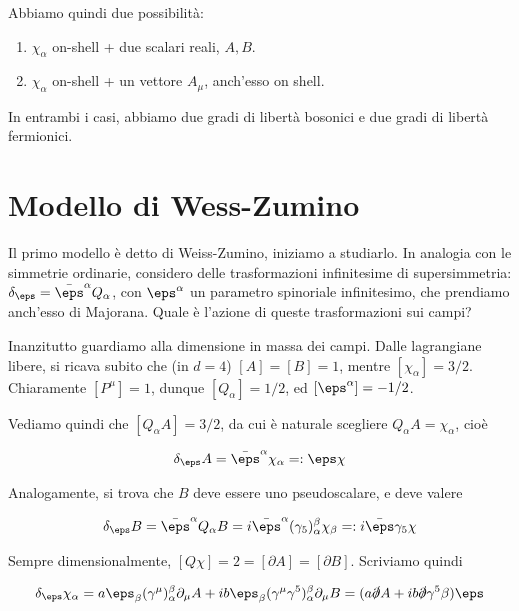 \documentclass{report}
\begin{document}
Abbiamo quindi due possibilità: 

\begin{enumerate}
    \item \(\chi_\alpha\) on-shell + due scalari reali, \(A, B\). 
    \item \(\chi_\alpha\) on-shell + un vettore \(A_\mu\), anch'esso on shell. 
\end{enumerate}

In entrambi i casi, abbiamo due gradi di libertà bosonici e due gradi di libertà fermionici. 

\section{Modello di Wess-Zumino}

Il primo modello è detto di Weiss-Zumino, iniziamo a studiarlo. In analogia con le simmetrie ordinarie, considero delle trasformazioni infinitesime di supersimmetria: \(\delta_\eps = \bar{\eps}^\alpha Q_\alpha\), con \(\eps^\alpha\) un parametro spinoriale infinitesimo, che prendiamo anch'esso di Majorana. Quale è l'azione di queste trasformazioni sui campi? 

Inanzitutto guardiamo alla dimensione in massa dei campi. Dalle lagrangiane libere, si ricava subito che (in \(d=4\)) \([A] = [B] = 1\), mentre \([\chi_\alpha] = 3/2\). Chiaramente \([P^\mu] = 1\), dunque \([Q_\alpha] = 1/2\), ed \([\eps^\alpha] = -1/2\). 

Vediamo quindi che \([Q_\alpha A] = 3/2\), da cui è naturale scegliere \(Q_\alpha A = \chi_\alpha\), cioè 

\begin{align}
    \delta_\eps A = \bar{\eps}^\alpha \chi_\alpha =: \eps \chi 
\end{align}

Analogamente, si trova che \(B\) deve essere uno pseudoscalare, e deve valere 

\begin{align}
    \delta_\eps B = \bar{\eps}^\alpha Q_\alpha B = i\bar{\eps}^\alpha (\gamma_5)^\beta_\alpha \chi_\beta =: i \bar{\eps}\gamma_5 \chi
\end{align}

Sempre dimensionalmente, \([Q\chi] = 2 = [\partial A] = [\partial B]\). Scriviamo quindi 

\begin{align}
    \delta_\eps \chi_\alpha = a\eps_\beta (\gamma^\mu)^\beta_\alpha \partial_\mu A + ib\eps_\beta (\gamma^\mu \gamma^5)^\beta_\alpha \partial_\mu B = (a\slashed{\partial}A + ib\slashed{\partial}\gamma^5 \beta)\eps
\end{align}
\end{document}
